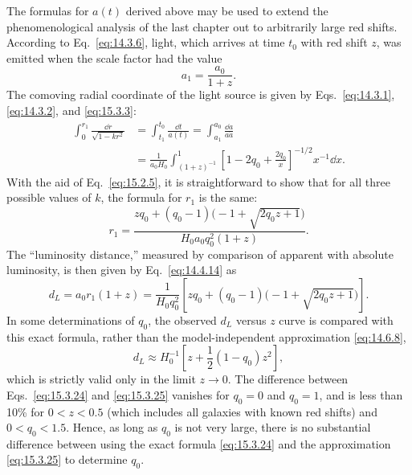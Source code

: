The formulas for \(a(t)\) derived above may be used to extend the
phenomenological analysis of the last chapter out to arbitrarily large red
shifts. According to Eq.~\eqref{eq:14.3.6}, light, which arrives at time
\(t_0\) with red shift \(z\), was emitted when the scale factor had the value
\begin{equation}
  a_1=\frac{a_0}{1+z}.
  \tag{15.3.22}\label{eq:15.3.22}
\end{equation}
The comoving radial coordinate of the light source is given by
Eqs.~\eqref{eq:14.3.1}, \eqref{eq:14.3.2}, and \eqref{eq:15.3.3}:
\begin{align*}
  \int_0^{r_1}\frac{\dd r}{\sqrt{1-kr^2}}
  &=
  \int_{t_1}^{t_0}\frac{\dd t}{a(t)}
  =
  \int_{a_1}^{a_0}\frac{\dd a}{a\dot a}\\
  &=
  \frac1{a_0H_0}
  \int_{(1+z)^{-1}}^1
  \left[
    1-2q_0+\frac{2q_0}{x}
  \right]^{-1/2}
  x^{-1}\dd x.
\end{align*}
With the aid of Eq.~\eqref{eq:15.2.5}, it is straightforward to show that
for all three possible values of \(k\), the formula for \(r_1\) is the same:
\begin{equation}
  r_1
  =
  \frac{
    zq_0+(q_0-1)\bigl(-1+\sqrt{2q_0z+1}\bigr)
  }{
    H_0a_0q_0^2(1+z)
  }.
  \tag{15.3.23}\label{eq:15.3.23}
\end{equation}
The ``luminosity distance,'' measured by comparison of apparent with absolute
luminosity, is then given by Eq.~\eqref{eq:14.4.14} as
\begin{equation}
  d_L
  =
  a_0r_1(1+z)
  =
  \frac1{H_0q_0^2}
  \left[
    zq_0+(q_0-1)\bigl(-1+\sqrt{2q_0z+1}\bigr)
  \right].
  \tag{15.3.24}\label{eq:15.3.24}
\end{equation}
In some determinations of \(q_0\), the observed \(d_L\) versus \(z\) curve
is compared with this exact formula, rather than the model-independent
approximation \eqref{eq:14.6.8},
\begin{equation}
  d_L
  \approx
  H_0^{-1}\left[z+\frac12(1-q_0)z^2\right],
  \tag{15.3.25}\label{eq:15.3.25}
\end{equation}
which is strictly valid only in the limit \(z\to0\). The difference between
Eqs.~\eqref{eq:15.3.24} and \eqref{eq:15.3.25} vanishes for \(q_0=0\)
and \(q_0=1\), and is less than 10\% for \(0<z<0.5\) (which includes all
galaxies with known red shifts) and \(0<q_0<1.5\). Hence, as long as \(q_0\)
is not very large, there is no substantial difference between using the exact
formula \eqref{eq:15.3.24} and the approximation \eqref{eq:15.3.25} to
determine \(q_0\).

